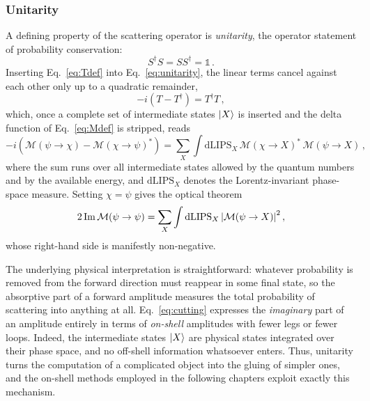 \subsubsection{Unitarity\label{sec:unitarity}}

A defining property of the scattering operator is \textit{unitarity}, the operator statement of
probability conservation:
\begin{equation}\label{eq:unitarity}
    S^\dagger S = SS^\dagger = \mathbb 1\,.
\end{equation}
Inserting Eq.~\eqref{eq:Tdef} into Eq.~\eqref{eq:unitarity}, the linear terms cancel against each
other only up to a quadratic remainder,
\begin{equation}
    -i\left(T - T^\dagger\right) = T^\dagger T\,,
\end{equation}
which, once a complete set of intermediate states $\ket{X}$ is inserted and the delta function of
Eq.~\eqref{eq:Mdef} is stripped, reads
\begin{equation}\label{eq:cutting}
    -i\left(\mathcal M(\psi\to\chi) - \mathcal M(\chi\to\psi)^*\right)
    = \sum_X \int \text{dLIPS}_X\,\mathcal M(\chi\to X)^*\,\mathcal M(\psi\to X)\,,
\end{equation}
where the sum runs over all intermediate states allowed by the quantum numbers and by the available
energy, and $\text{dLIPS}_X$ denotes the Lorentz-invariant phase-space measure. Setting
$\chi=\psi$ gives the optical theorem
\begin{equation}\label{eq:optical}
    2\Im \mathcal M(\psi\to\psi) = \sum_X \int \text{dLIPS}_X\,\abs{\mathcal M(\psi\to X)}^2\,,
\end{equation}
whose right-hand side is manifestly non-negative.

The underlying physical interpretation is straightforward: whatever probability is removed from the forward direction must
reappear in some final state, so the absorptive part of a forward amplitude measures the total
probability of scattering into anything at all. 
Eq.~\eqref{eq:cutting} expresses the
\textit{imaginary} part of an amplitude entirely in terms of \textit{on-shell} amplitudes with fewer
legs or fewer loops. Indeed, the intermediate states $\ket{X}$ are physical states integrated over their
phase space, and no off-shell information whatsoever enters. Thus, unitarity turns the computation of
a complicated object into the gluing of simpler ones, 
and the on-shell methods employed in the following chapters exploit exactly this mechanism.

